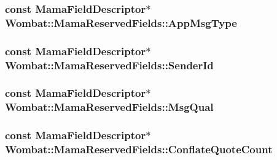 \label{classWombat_1_1MamaReservedFields_aa50d879ffe055bae5714419dfb5e4386}
\hypertarget{classWombat_1_1MamaReservedFields_aa9dabe06499090efb80fe179dc16e677}{
\subsubsection[{AppMsgType}]{\setlength{\rightskip}{0pt plus 5cm}const {\bf MamaFieldDescriptor}$\ast$ {\bf Wombat::MamaReservedFields::AppMsgType}}}
\label{classWombat_1_1MamaReservedFields_aa9dabe06499090efb80fe179dc16e677}
\hypertarget{classWombat_1_1MamaReservedFields_a2ab4cbfb056eb7043cb0c3bbb91b06c5}{
\subsubsection[{SenderId}]{\setlength{\rightskip}{0pt plus 5cm}const {\bf MamaFieldDescriptor}$\ast$ {\bf Wombat::MamaReservedFields::SenderId}}}
\label{classWombat_1_1MamaReservedFields_a2ab4cbfb056eb7043cb0c3bbb91b06c5}
\hypertarget{classWombat_1_1MamaReservedFields_a8fc4203af2f0a35f1371ec02c2ec2aea}{
\subsubsection[{MsgQual}]{\setlength{\rightskip}{0pt plus 5cm}const {\bf MamaFieldDescriptor}$\ast$ {\bf Wombat::MamaReservedFields::MsgQual}}}
\label{classWombat_1_1MamaReservedFields_a8fc4203af2f0a35f1371ec02c2ec2aea}
\hypertarget{classWombat_1_1MamaReservedFields_afcb05ec0a59c5e50608d787c8e057a3f}{
\subsubsection[{ConflateQuoteCount}]{\setlength{\rightskip}{0pt plus 5cm}const {\bf MamaFieldDescriptor}$\ast$ {\bf Wombat::MamaReservedFields::ConflateQuoteCount}}}
